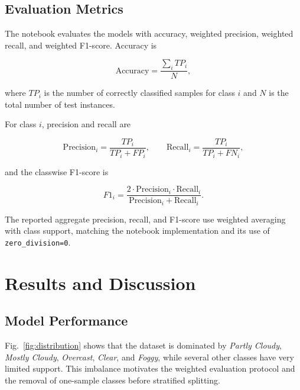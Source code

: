 \documentclass[10pt,letterpaper,twocolumn]{article}
\begin{document}
\subsection{Evaluation Metrics}

The notebook evaluates the models with accuracy, weighted precision, weighted recall, and weighted F1-score. Accuracy is

\begin{equation}
\text{Accuracy}
=
\frac{\sum_i TP_i}{N},
\end{equation}

where $TP_i$ is the number of correctly classified samples for class $i$ and $N$ is the total number of test instances.

For class $i$, precision and recall are

\begin{equation}
\text{Precision}_i
=
\frac{TP_i}{TP_i+FP_i},
\qquad
\text{Recall}_i
=
\frac{TP_i}{TP_i+FN_i},
\end{equation}

and the classwise F1-score is

\begin{equation}
F1_i
=
\frac{
2 \cdot \text{Precision}_i \cdot \text{Recall}_i
}{
\text{Precision}_i+\text{Recall}_i
}.
\end{equation}

The reported aggregate precision, recall, and F1-score use weighted averaging with class support, matching the notebook implementation and its use of \texttt{zero\_division=0}.

\section{Results and Discussion}

\subsection{Model Performance}

Fig.~\ref{fig:distribution} shows that the dataset is dominated by \textit{Partly Cloudy}, \textit{Mostly Cloudy}, \textit{Overcast}, \textit{Clear}, and \textit{Foggy}, while several other classes have very limited support. This imbalance motivates the weighted evaluation protocol and the removal of one-sample classes before stratified splitting.
\end{document}
